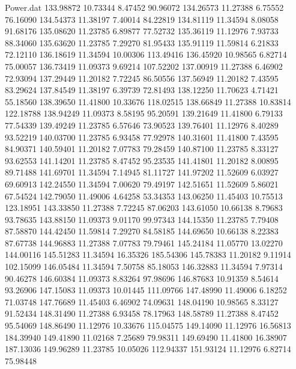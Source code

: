 \begin{filecontents}{Power.dat}
 133.98872   10.73344    8.47452   90.96072
 134.26573   11.27388    6.75552   76.16090
 134.54373   11.38197    7.40014   84.22819
 134.81119   11.34594    8.08058   91.68176
 135.08620   11.23785    6.89877   77.52732
 135.36119   11.12976    7.93733   88.34060
 135.63620   11.23785    7.29270   81.95433
 135.91119   11.59814    6.21833   72.12110
 136.18619   11.34594   10.00306  113.49416
 136.45920   10.98565    6.82714   75.00057
 136.73419   11.09373    9.69214  107.52202
 137.00919   11.27388    6.46902   72.93094
 137.29449   11.20182    7.72245   86.50556
 137.56949   11.20182    7.43595   83.29624
 137.84549   11.38197    6.39739   72.81493
 138.12250   11.70623    4.71421   55.18560
 138.39650   11.41800   10.33676  118.02515
 138.66849   11.27388   10.83814  122.18788
 138.94249   11.09373    8.58195   95.20591
 139.21649   11.41800    6.79133   77.54339
 139.49249   11.23785    6.57646   73.90523
 139.76401   11.12976    8.40289   93.52219
 140.03700   11.23785    6.93458   77.92978
 140.31601   11.41800    7.43595   84.90371
 140.59401   11.20182    7.07783   79.28459
 140.87100   11.23785    8.33127   93.62553
 141.14201   11.23785    8.47452   95.23535
 141.41801   11.20182    8.00895   89.71488
 141.69701   11.34594    7.14945   81.11727
 141.97202   11.52609    6.03927   69.60913
 142.24550   11.34594    7.00620   79.49197
 142.51651   11.52609    5.86021   67.54524
 142.79050   11.49006    4.64258   53.34353
 143.06250   11.45403   10.75513  123.18951
 143.33850   11.27388    7.72245   87.06203
 143.61050   10.66138    8.79683   93.78635
 143.88150   11.09373    9.01170   99.97343
 144.15350   11.23785    7.79408   87.58870
 144.42450   11.59814    7.29270   84.58185
 144.69650   10.66138    8.22383   87.67738
 144.96883   11.27388    7.07783   79.79461
 145.24184   11.05770   13.02270  144.00116
 145.51283   11.34594   16.35326  185.54306
 145.78383   11.20182    9.11914  102.15099
 146.05484   11.34594    7.50758   85.18053
 146.32883   11.34594    7.97314   90.46278
 146.60384   11.09373    8.83264   97.98696
 146.87683   10.91359    8.54614   93.26906
 147.15083   11.09373   10.01445  111.09766
 147.48990   11.49006    6.18252   71.03748
 147.76689   11.45403    6.46902   74.09631
 148.04190   10.98565    8.33127   91.52434
 148.31490   11.27388    6.93458   78.17963
 148.58789   11.27388    8.47452   95.54069
 148.86490   11.12976   10.33676  115.04575
 149.14090   11.12976   16.56813  184.39940
 149.41890   11.02168    7.25689   79.98311
 149.69490   11.41800   16.38907  187.13036
 149.96289   11.23785   10.05026  112.94337
 151.93124   11.12976    6.82714   75.98448

\end{filecontents}

